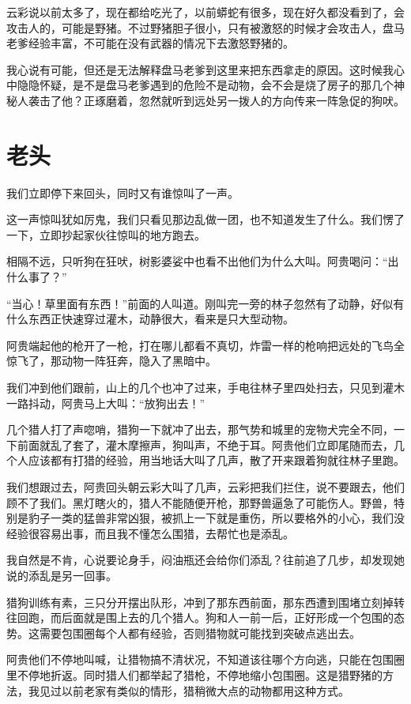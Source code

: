 云彩说以前太多了，现在都给吃光了，以前蟒蛇有很多，现在好久都没看到了，会攻击人的，可能是野猪。不过野猪胆子很小，只有被激怒的时候才会攻击人，盘马老爹经验丰富，不可能在没有武器的情况下去激怒野猪的。

我心说有可能，但还是无法解释盘马老爹到这里来把东西拿走的原因。这时候我心中隐隐怀疑，是不是盘马老爹遇到的危险不是动物，会不会是烧了房子的那几个神秘人袭击了他？正琢磨着，忽然就听到远处另一拨人的方向传来一阵急促的狗吠。

\chapter{老头}

我们立即停下来回头，同时又有谁惊叫了一声。

这一声惊叫犹如厉鬼，我们只看见那边乱做一团，也不知道发生了什么。我们愣了一下，立即抄起家伙往惊叫的地方跑去。

相隔不远，只听狗在狂吠，树影婆娑中也看不出他们为什么大叫。阿贵喝问：“出什么事了？”

“当心！草里面有东西！”前面的人叫道。刚叫完一旁的林子忽然有了动静，好似有什么东西正快速穿过灌木，动静很大，看来是只大型动物。

阿贵端起他的枪开了一枪，打在哪儿都看不真切，炸雷一样的枪响把远处的飞鸟全惊飞了，那动物一阵狂奔，隐入了黑暗中。

我们冲到他们跟前，山上的几个也冲了过来，手电往林子里四处扫去，只见到灌木一路抖动，阿贵马上大叫：“放狗出去！”

几个猎人打了声唿哨，猎狗一下就冲了出去，那气势和城里的宠物犬完全不同，一下前面就乱了套了，灌木摩擦声，狗叫声，不绝于耳。阿贵他们立即尾随而去，几个人应该都有打猎的经验，用当地话大叫了几声，散了开来跟着狗就往林子里跑。

我们想跟过去，阿贵回头朝云彩大叫了几声，云彩把我们拦住，说不要跟去，他们顾不了我们。黑灯瞎火的，猎人不能随便开枪，那野兽逼急了可能伤人。野兽，特别是豹子一类的猛兽非常凶狠，被抓上一下就是重伤，所以要格外的小心，我们没经验很容易出事，而且我不懂怎么围猎，去帮忙也是添乱。

我自然是不肯，心说要论身手，闷油瓶还会给你们添乱？往前追了几步，却发现她说的添乱是另一回事。

猎狗训练有素，三只分开摆出队形，冲到了那东西前面，那东西遭到围堵立刻掉转往回跑，而后面就是围上去的几个猎人。狗和人一前一后，正好形成一个包围的态势。这需要包围圈每个人都有经验，否则猎物就可能找到突破点逃出去。

阿贵他们不停地叫喊，让猎物搞不清状况，不知道该往哪个方向逃，只能在包围圈里不停地折返。同时猎人们都举起了猎枪，不停地缩小包围圈。这是猎野猪的方法，我见过以前老家有类似的情形，猎稍微大点的动物都用这种方式。

